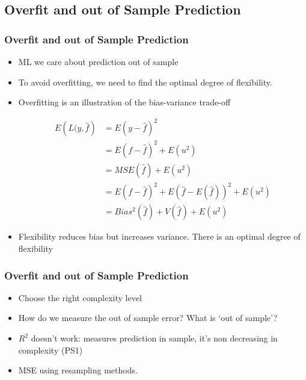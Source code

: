 \documentclass[
  shownotes,
  xcolor={svgnames},
  hyperref={colorlinks,citecolor=DarkBlue,linkcolor=DarkRed,urlcolor=DarkBlue}
  , aspectratio=169]{beamer}
\begin{document}
\subsection{Overfit and out of Sample Prediction}
\begin{frame}[fragile]
\frametitle{Overfit and out of Sample Prediction}


\begin{itemize}
  \item ML we care about prediction out of sample
  \medskip

  \item To avoid overfitting, we need to find the optimal degree of flexibility.
\medskip
  \item Overfitting is an illustration of the bias-variance trade-off 


\begin{align}
E \left(L(y,\hat{f} \right)  &= E(y-\hat f)^2  \\
                 &= E(f-\hat{f})^2 + E(u^2) \\
                 &=  MSE(\hat f) + E(u^2) \\
                 &=  E(f-\hat f)^2 +E(\hat f-E(\hat f))^2+ E(u^2) \\
                 &= Bias^2(\hat f) + V(\hat f) + E(u^2)
\end{align}

\item Flexibility reduces bias but increases variance. There is an optimal degree of flexibility
  \end{itemize}
\end{frame}
\begin{frame}[fragile]
\frametitle{Overfit and out of Sample Prediction}


\begin{itemize}

  \medskip
  \item Choose the right complexity level
  \medskip
  \item How do we measure the out of sample error? What is `out of sample'?
  \medskip
  \item $R^2$ doesn't work: measures prediction in sample, it's non decreasing in complexity (PS1)
  \pause
  \medskip
  \item MSE using resampling methods.
\end{itemize}

\end{frame}
\end{document}

